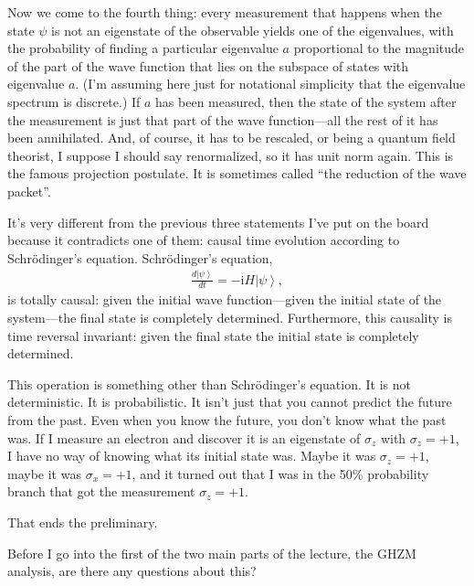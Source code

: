 \documentclass[12pt,nofootinbib]{revtex4}
\newcommand{\ket}[1]{\left|#1\right\rangle}
\renewcommand{\i}{\text{i}}
\begin{document}
Now we come to the fourth thing:  every measurement that happens when the state $\psi$ is not an eigenstate of the observable yields one of the eigenvalues, with the probability of finding a particular eigenvalue $a$ proportional to the magnitude of the part of the wave function that lies on the subspace of states with eigenvalue $a$. (I'm assuming here just for notational simplicity that the eigenvalue spectrum is discrete.) If $a$ has been measured, then the state of the system after the measurement is just that part of the wave function---all the rest of it has been annihilated. And, of course, it has to be rescaled, or being a quantum field theorist, I suppose I should say renormalized, so it has unit norm again. This is the famous projection postulate.  It is sometimes called ``the reduction of the wave packet''. 

It's very different from the previous three statements I've put on the board because it contradicts one of them: causal time evolution according to Schrödinger's equation.  Schrödinger's equation,
\begin{align}
  \frac{d\ket{\psi}}{dt} = -\i H\ket{\psi},
\end{align}
is totally causal: given the initial wave function---given the initial state of the system---the final state is completely determined. Furthermore, this causality is time reversal invariant: given the final state the initial state is completely determined.

This operation is something other than Schrödinger's equation. It is not deterministic. It is probabilistic. It isn't just that you cannot predict the future from the past. Even when you know the future, you don't know what the past was. If I measure an electron and discover it is an eigenstate of $\sigma_z$ with $\sigma_z = +1$, I have no way of knowing what its initial state was. Maybe it was $\sigma_z = +1$, maybe it was $\sigma_x = +1$, and it turned out that I was in the 50\% probability branch that got the measurement $\sigma_z = +1$.

That ends the preliminary.
\medskip

Before I go into the first of the two main parts of the lecture, the GHZM  \cite{greenberger-89proc,mermin90pt9}
analysis, are there any questions about this?
\end{document}
